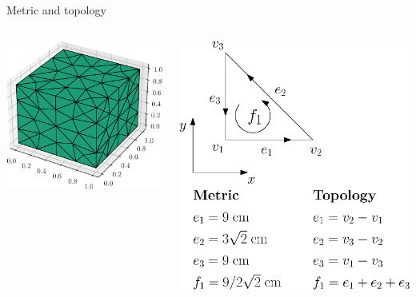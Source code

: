 \documentclass[aspectratio=169]{beamer}
\begin{document}
\begin{frame}{Metric and topology}
	\begin{columns}
		\begin{column}{.5\textwidth}
				\includegraphics[width=.9\columnwidth]{mesh_cube.pdf}
		\end{column}
	\begin{column}{.5\textwidth}
		\includegraphics[width=.9\columnwidth]{topology.eps}
		\vspace{1cm}
	\end{column}
	\end{columns}

\end{frame}
\end{document}
